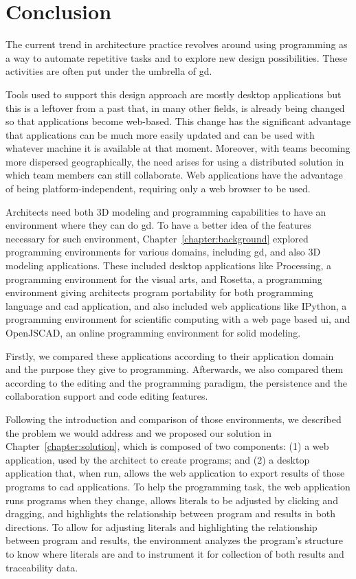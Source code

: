 
\chapter{Conclusion}
\label{chapter:conclusion}
The current trend in architecture practice revolves around using programming as a way to automate repetitive tasks and to explore new design possibilities.
These activities are often put under the umbrella of \acrfull{gd}.

Tools used to support this design approach are mostly desktop applications but this is a leftover from a past that, in many other fields, is already being changed so that applications become web-based.
This change has the significant advantage that applications can be much more easily updated and can be used with whatever machine it is available at that moment.
Moreover, with teams becoming more dispersed geographically, the need arises for using a distributed solution in which team members can still collaborate.
Web applications have the advantage of being platform-independent, requiring only a web browser to be used.

Architects need both 3D modeling and programming capabilities to have an environment where they can do \gls{gd}.
To have a better idea of the features necessary for such environment, Chapter~\ref{chapter:background} explored programming environments for various domains, including \gls{gd}, and also 3D modeling applications.
These included desktop applications like Processing, a programming environment for the visual arts, and Rosetta, a programming environment giving architects program portability for both programming language and \gls{cad} application, and also included web applications like IPython, a programming environment for scientific computing with a web page based \gls{ui}, and OpenJSCAD, an online programming environment for solid modeling.

Firstly, we compared these applications according to their application domain and the purpose they give to programming.
Afterwards, we also compared them according to the editing and the programming paradigm, the persistence and the collaboration support and code editing features.

Following the introduction and comparison of those environments, we described the problem we would address and we proposed our solution in Chapter~\ref{chapter:solution}, which is composed of two components:
(1) a web application, used by the architect to create programs;
and (2) a desktop application that, when run, allows the web application to export results of those programs to \gls{cad} applications.
To help the programming task, the web application runs programs when they change, allows literals to be adjusted by clicking and dragging, and highlights the relationship between program and results in both directions.
To allow for adjusting literals and highlighting the relationship between program and results, the environment analyzes the program's structure to know where literals are and to instrument it for collection of both results and traceability data.

